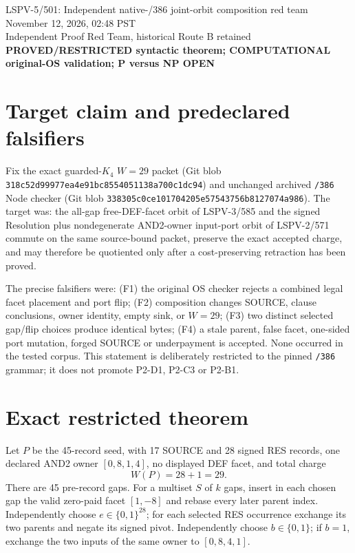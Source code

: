\documentclass[11pt]{article}
\begin{document}
\begin{center}
{\Large LSPV-5/501: Independent native-/386 joint-orbit composition red team}\\[4pt]
November 12, 2026, 02:48 PST\\
Independent Proof Red Team, historical Route B retained\\
\textbf{PROVED/RESTRICTED syntactic theorem; COMPUTATIONAL original-OS validation; P versus NP OPEN}
\end{center}

\section*{Target claim and predeclared falsifiers}
Fix the exact guarded-$K_4$ $W=29$ packet (Git blob
\texttt{318c52d99977ea4e91bc8554051138a700c1dc94}) and unchanged archived
\texttt{/386} Node checker (Git blob
\texttt{338305c0ce101704205e57543756b8127074a986}).  The target was:
the all-gap free-DEF-facet orbit of LSPV-3/585 and the signed Resolution plus
nondegenerate AND2-owner input-port orbit of LSPV-2/571 commute on the same
source-bound packet, preserve the exact accepted charge, and may therefore be
quotiented only after a cost-preserving retraction has been proved.

The precise falsifiers were: (F1) the original OS checker rejects a combined
legal facet placement and port flip; (F2) composition changes SOURCE, clause
conclusions, owner identity, empty sink, or $W=29$; (F3) two distinct selected
gap/flip choices produce identical bytes; (F4) a stale parent, false facet,
one-sided port mutation, forged SOURCE or underpayment is accepted.  None
occurred in the tested corpus.  This statement is deliberately restricted to
the pinned \texttt{/386} grammar; it does not promote P2-D1, P2-C3 or P2-B1.

\section*{Exact restricted theorem}
Let $P$ be the 45-record seed, with 17 SOURCE and 28 signed RES records, one
declared AND2 owner $[0,8,1,4]$, no displayed DEF facet, and total charge
\[
W(P)=28+1=29.
\]
There are 45 pre-record gaps.  For a multiset $S$ of $k$ gaps, insert in each
chosen gap the valid zero-paid facet $[1,-8]$ and rebase every later parent
index.  Independently choose $e\in\{0,1\}^{28}$; for each selected RES
occurrence exchange its two parents and negate its signed pivot.  Independently
choose $b\in\{0,1\}$; if $b=1$, exchange the two inputs of the same owner to
$[0,8,4,1]$.
\end{document}
